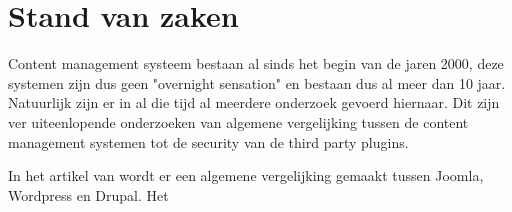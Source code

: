 \chapter{Stand van zaken}
\label{ch:stand-van-zaken}


Content management systeem bestaan al sinds het begin van de jaren 2000, deze systemen zijn dus geen "overnight sensation" en bestaan dus al meer dan 10 jaar. Natuurlijk zijn er in al die tijd al meerdere onderzoek gevoerd hiernaar. Dit zijn ver uiteenlopende onderzoeken van algemene vergelijking tussen de content management systemen tot de security van de third party plugins. 

In het artikel van \textcite{Patel2011} wordt er een algemene vergelijking gemaakt tussen Joomla, Wordpress en Drupal. Het 